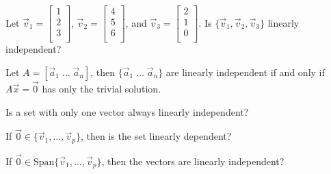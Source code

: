 \documentclass[12pt,letterpaper]{article}
\begin{document}
\begin{enumerate}
\Problem Let $\vec{v}_1=\begin{bmatrix} 1\\2\\3\\ \end{bmatrix}$, $\vec{v}_2=\begin{bmatrix} 4\\5\\6\\ \end{bmatrix}$, and $\vec{v}_3=\begin{bmatrix} 2\\1\\0\\ \end{bmatrix}$. Is $\{ \vec{v}_1, \vec{v}_2,\vec{v}_3 \}$ linearly independent?

\vfill

\vfill

\vfill


Let $A= [\vec{a}_1 \; \dots \; \vec{a}_n ]$, then $\{ \vec{a}_1 \; \dots \; \vec{a}_n \}$ are linearly independent if and only if $A \vec{x} = \vec{0}$ has only the trivial solution.

\Problem Is a set with only one vector always linearly independent?

\vfill

\Problem If $\vec{0} \in \{ \vec{v}_1, \dots, \vec{v}_p \}$, then is the set linearly dependent?

\vfill

\Problem If $\vec{0} \in \text{Span}\{ \vec{v}_1, \dots, \vec{v}_p \}$, then the vectors are linearly independent?

\vfill

\end{enumerate}
\end{document}

